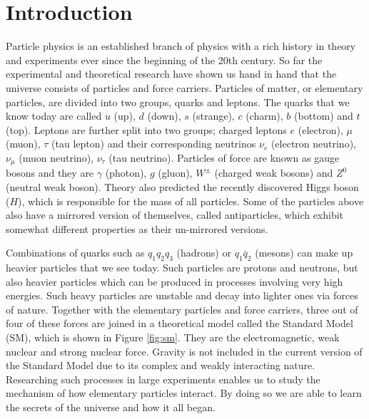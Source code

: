 \chapter{Introduction}

Particle physics is an established branch of physics with a rich history in theory and experiments ever since the beginning of the 20th century. So far the experimental and theoretical research have shown us hand in hand that the universe consists of particles and force carriers. Particles of matter, or elementary particles, are divided into two groups, quarks and leptons. The quarks that we know today are called $u$ (up), $d$ (down), $s$ (strange), $c$ (charm), $b$ (bottom) and $t$ (top). Leptons are  further split into two groups; charged leptons $e$ (electron), $\mu$ (muon), $\tau$ (tau lepton) and their corresponding neutrinos $\nu_e$ (electron neutrino), $\nu_\mu$ (muon neutrino), $\nu_\tau$ (tau neutrino). Particles of force are known as gauge bosons and they are $\gamma$ (photon), $g$ (gluon), $W^\pm$ (charged weak bosons) and $Z^0$ (neutral weak boson). Theory also predicted the recently discovered Higgs boson ($H$), which is responsible for the mass of all particles. Some of the particles above also have a mirrored version of themselves, called antiparticles, which exhibit somewhat different properties as their un-mirrored versions.

Combinations of quarks such as $q_1 q_2 q_3$ (hadrons) or $q_1 \bar{q}_2$ (mesons) can make up heavier particles that we see today. Such particles are protons and neutrons, but also heavier particles which can be produced in processes involving very high energies. Such heavy particles are unstable and decay into lighter ones via forces of nature. Together with the elementary particles and force carriers, three out of four of these forces are joined in a theoretical model called the Standard Model (SM), which is shown in Figure \ref{fig:sm}. They are the electromagnetic, weak nuclear and strong nuclear force. Gravity is not included in the current version of the Standard Model due to its complex and weakly interacting nature. Researching such processes in large experiments enables us to study the mechanism of how elementary particles interact. By doing so we are able to learn the secrets of the universe and how it all began.

